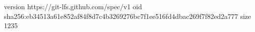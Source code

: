 version https://git-lfs.github.com/spec/v1
oid sha256:eb34513a61e852af84f8d7c4b3269276bc7f1ee516fd4dbac269f7f82ed2a777
size 1235
